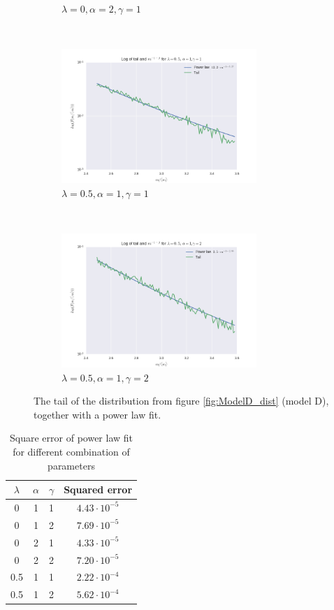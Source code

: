 \documentclass[a4paper, 10pt]{article}
\begin{document}
\begin{figure}[!ht]
\begin{subfigure}[H!]{0.5\textwidth}
        \caption{$\lambda=0, \alpha = 2, \gamma=1$}
    \end{subfigure}
     ~
    \begin{subfigure}[H!]{0.5\textwidth}
        \centering
        \includegraphics[height=2.0in]{tailL05A1G1.png}
        \caption{$\lambda=0.5, \alpha=1, \gamma=1$}
    \end{subfigure}
    ~
      \begin{subfigure}[H!]{0.5\textwidth}
        \centering
        \includegraphics[height=2.0in]{tailL05A1G2.png}
        \caption{$\lambda=0.5, \alpha=1, \gamma=2$}
    \end{subfigure}
\caption{The tail of the distribution from figure \ref{fig:ModelD_dist} (model D), together with a power law fit.}\label{fig:ModelD_tail}
\end{figure}
\begin{table}[!hb]
\centering
\caption{Square error of power law fit for different combination of parameters}\label{tab:parameters_D}
\begin{tabular}{|c|c|c|c|}
\hline
$\lambda$ & $\alpha$ & $\gamma$ & Squared error\\
\hline
0 & 1 & 1 & $4.43\cdot 10^{-5}$\\
0 & 1 & 2 & $7.69\cdot 10^{-5}$\\
0 & 2 & 1 & $4.33\cdot 10^{-5}$\\
0 & 2 & 2 & $7.20 \cdot 10^{-5}$\\
0.5 & 1 & 1 & $2.22\cdot 10^{-4}$\\
0.5 & 1 & 2 & $5.62\cdot 10^{-4}$\\

\hline
\end{tabular}
\end{table} 
\end{document}
